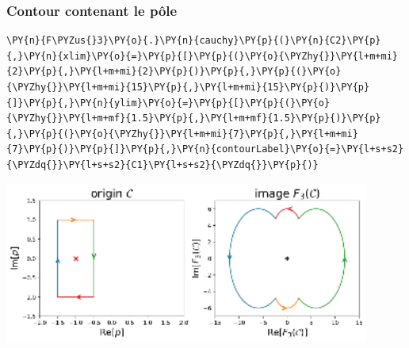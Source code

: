\subsubsection{Contour contenant le pôle}
\begin{tcolorbox}[breakable, size=fbox, boxrule=1pt, pad at break*=1mm,colback=cellbackground, colframe=cellborder]
\begin{Verbatim}[commandchars=\\\{\}]
\PY{n}{F\PYZus{}3}\PY{o}{.}\PY{n}{cauchy}\PY{p}{(}\PY{n}{C2}\PY{p}{,}\PY{n}{xlim}\PY{o}{=}\PY{p}{[}\PY{p}{(}\PY{o}{\PYZhy{}}\PY{l+m+mi}{2}\PY{p}{,}\PY{l+m+mi}{2}\PY{p}{)}\PY{p}{,}\PY{p}{(}\PY{o}{\PYZhy{}}\PY{l+m+mi}{15}\PY{p}{,}\PY{l+m+mi}{15}\PY{p}{)}\PY{p}{]}\PY{p}{,}\PY{n}{ylim}\PY{o}{=}\PY{p}{[}\PY{p}{(}\PY{o}{\PYZhy{}}\PY{l+m+mf}{1.5}\PY{p}{,}\PY{l+m+mf}{1.5}\PY{p}{)}\PY{p}{,}\PY{p}{(}\PY{o}{\PYZhy{}}\PY{l+m+mi}{7}\PY{p}{,}\PY{l+m+mi}{7}\PY{p}{)}\PY{p}{]}\PY{p}{,}\PY{n}{contourLabel}\PY{o}{=}\PY{l+s+s2}{\PYZdq{}}\PY{l+s+s2}{C1}\PY{l+s+s2}{\PYZdq{}}\PY{p}{)}
\end{Verbatim}
\end{tcolorbox}
\begin{center}
    \includegraphics[width=0.9\textwidth]{notebook/fig/output_35_1.eps}
\end{center}
